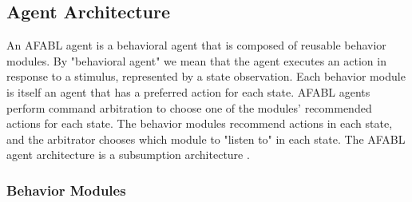 






\subsection{Agent Architecture}

An AFABL agent is a behavioral agent that is composed of reusable behavior modules.  By "behavioral agent" we mean that the agent executes an action in response to a stimulus, represented by a state observation.  Each behavior module is itself an agent that has a preferred action for each state.  AFABL agents perform command arbitration to choose one of the modules' recommended actions for each state.  The behavior modules recommend actions in each state, and the arbitrator chooses which module to "listen to" in each state.  The AFABL agent architecture is a subsumption architecture \cite{brooks1986a-robust}.

\subsubsection{Behavior Modules}

